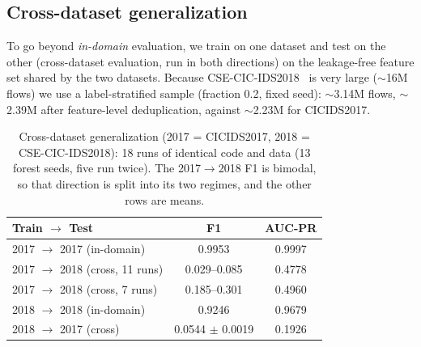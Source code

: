 \documentclass[11pt,conference,a4paper]{IEEEtran}
\begin{document}
\subsection{Cross-dataset generalization}
\label{sec:cross-dataset}

To go beyond \emph{in-domain} evaluation, we train on one dataset and test on the other (cross-dataset evaluation, run in both directions) on the leakage-free feature set shared by the two datasets. Because CSE-CIC-IDS2018~\cite{csecicids2018} is very large ($\sim$16M flows) we use a label-stratified sample (fraction 0.2, fixed seed): $\sim$3.14M flows, $\sim$2.39M after feature-level deduplication, against $\sim$2.23M for CICIDS2017.

\begin{table}[htbp]
  \caption{Cross-dataset generalization (2017 = CICIDS2017, 2018 = CSE-CIC-IDS2018):
  18 runs of identical code and data (13 forest seeds, five run twice). The 2017$\to$2018 F1 is bimodal, so that
  direction is split into its two regimes, and the other rows are means.}
  \label{tab:cross-dataset}
  \centering
  \footnotesize
  \begin{tabular}{lcc}
    \toprule
    Train $\to$ Test & F1 & AUC-PR \\
    \midrule
    2017 $\to$ 2017 (in-domain) & 0.9953 & 0.9997 \\
    2017 $\to$ 2018 (cross, 11 runs) & 0.029--0.085 & 0.4778 \\
    2017 $\to$ 2018 (cross, 7 runs) & 0.185--0.301 & 0.4960 \\
    2018 $\to$ 2018 (in-domain) & 0.9246 & 0.9679 \\
    2018 $\to$ 2017 (cross) & 0.0544 $\pm$ 0.0019 & 0.1926 \\
    \bottomrule
  \end{tabular}
\end{table}
\end{document}
